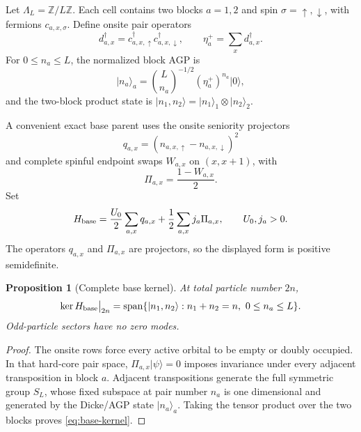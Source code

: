 \documentclass[11pt]{article}
\newtheorem{proposition}[theorem]{Proposition}
\theoremstyle{definition}
\theoremstyle{remark}
\newcommand{\Span}{\operatorname{span}}
\newcommand{\ket}[1]{\lvert #1\rangle}
\begin{document}
Let $\Lambda_L=\mathbb Z/L\mathbb Z$.  Each cell contains two blocks $a=1,2$ and spin $\sigma=\uparrow,\downarrow$, with fermions $c_{a,x,\sigma}$.  Define onsite pair operators
\begin{equation}
 d_{a,x}^\dagger=c_{a,x,\uparrow}^\dagger c_{a,x,\downarrow}^\dagger,
 \qquad
 \eta_a^+=\sum_x d_{a,x}^\dagger.
\end{equation}
For $0\le n_a\le L$, the normalized block AGP is
\begin{equation}
 \ket{n_a}_a=\binom{L}{n_a}^{-1/2}(\eta_a^+)^{n_a}\ket0,
\end{equation}
and the two-block product state is $\ket{n_1,n_2}=\ket{n_1}_1\otimes\ket{n_2}_2$.

A convenient exact base parent uses the onsite seniority projectors
\begin{equation}
 q_{a,x}=(n_{a,x,\uparrow}-n_{a,x,\downarrow})^2
\end{equation}
and complete spinful endpoint swaps $W_{a,x}$ on $(x,x+1)$, with
\begin{equation}
 \Pi_{a,x}=\frac{1-W_{a,x}}2.
\end{equation}
Set
\begin{equation}
 H_{\rm base}=\frac{U_0}{2}\sum_{a,x}q_{a,x}
 +\frac12\sum_{a,x}j_a\Pi_{a,x},
 \qquad U_0,j_a>0.
 \label{eq:Hbase}
\end{equation}
The operators $q_{a,x}$ and $\Pi_{a,x}$ are projectors, so the displayed form is positive semidefinite.

\begin{proposition}[Complete base kernel]
\label{prop:base-kernel}
At total particle number $2n$,
\begin{equation}
 \ker H_{\rm base}\big|_{2n}
 =\Span\{\ket{n_1,n_2}:n_1+n_2=n,\ 0\le n_a\le L\}.
 \label{eq:base-kernel}
\end{equation}
Odd-particle sectors have no zero modes.
\end{proposition}

\begin{proof}
The onsite rows force every active orbital to be empty or doubly occupied.  In that hard-core pair space, $\Pi_{a,x}\ket\psi=0$ imposes invariance under every adjacent transposition in block $a$.  Adjacent transpositions generate the full symmetric group $S_L$, whose fixed subspace at pair number $n_a$ is one dimensional and generated by the Dicke/AGP state $\ket{n_a}_a$.  Taking the tensor product over the two blocks proves \eqref{eq:base-kernel}.
\end{proof}
\end{document}
